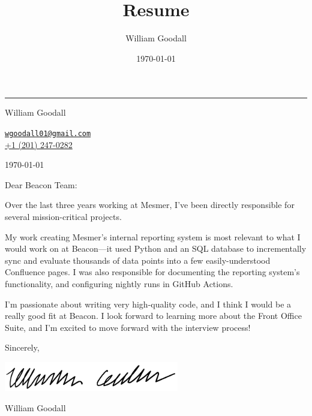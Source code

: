 \documentclass[letterpaper,12pt]{article}
\title{Resume}
\author{William Goodall}
\date{\today}
\begin{document}
\pagestyle{empty}


\hrule\vbeat\vbeat

{\large{}William Goodall}
	
\href{mailto:wgoodall01@gmail.com}{\tt wgoodall01@gmail.com}\\
\href{tel:2012470282}{+1 (201) 247-0282}

\vbeat\vbeat

\today

\vbeat\vbeat

Dear Beacon Team:

Over the last three years working at Mesmer, I've been directly responsible for several mission-critical projects.

My work creating Mesmer's internal reporting system is most relevant to what I would work on at Beacon---it used Python and an SQL database to incrementally sync and evaluate thousands of data points into a few easily-understood Confluence pages. I was also responsible for documenting the reporting system's functionality, and configuring nightly runs in GitHub Actions.

I'm passionate about writing very high-quality code, and I think I would be a really good fit at Beacon. I look forward to learning more about the Front Office Suite, and I'm excited to move forward with the interview process!

\vbeat\vbeat

Sincerely,

\includegraphics[width=3in]{signature.pdf}

William Goodall
\end{document}
